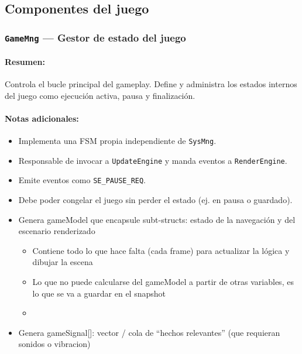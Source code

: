 \documentclass[11pt,a4paper]{article}
\begin{document}
\subsection{Componentes del juego}

\subsubsection{\texttt{GameMng} — Gestor de estado del juego}
\paragraph{Resumen:} Controla el bucle principal del gameplay. Define y administra los estados internos del juego como ejecución activa, pausa y finalización.
\paragraph{Notas adicionales:}
\begin{itemize}
  \item Implementa una FSM propia independiente de \texttt{SysMng}.
  \item Responsable de invocar a \texttt{UpdateEngine} y manda eventos a \texttt{RenderEngine}.
  \item Emite eventos como \texttt{SE\_PAUSE\_REQ}.
  \item Debe poder congelar el juego sin perder el estado (ej. en pausa o guardado).
  \item Genera gameModel que encapsule subt-structs: estado de la navegación y del escenario renderizado
  \begin{itemize}
    \item Contiene todo lo que hace falta (cada frame) para actualizar la lógica y dibujar la escena
    \item Lo que no puede calcularse del gameModel a partir de otras variables, es lo que se va a guardar en el snapshot
    \item 
  \end{itemize}
  \item Genera gameSignal[]: vector / cola de “hechos relevantes” (que requieran sonidos o vibracion)
\end{itemize}
\end{document}
